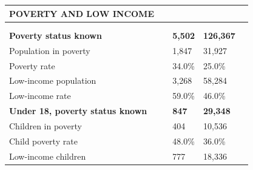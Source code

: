 \documentclass[9pt]{report}
\begin{document}
\vspace{12pt}
\setlength{\tabcolsep}{.01in} %
\begin{tabular}{p{.10in}p{.10in}p{.10in}p{3.7in}>{\hfill}p{.85in}>{\hfill}p{.85in}>{\hfill}p{.85in}>{\hfill}p{.85in}p{0.1in}}
\multicolumn{9}{l}{\parbox{7.1in}{\raggedright{\large{\strut\textbf{POVERTY AND LOW INCOME}\strut}}}} \\ 
\hline
\multicolumn{4}{l}{\parbox{3.5in}{\raggedright{\textbf{}}}} & \multicolumn{1}{r}{\parbox{.85in}{\strut\raggedleft{\textbf{}\strut}}} & \multicolumn{1}{r}{\parbox{.85in}{\strut\raggedleft{\textbf{}\strut}}} & \multicolumn{1}{r}{\parbox{.85in}{\strut{}}} & \multicolumn{1}{r}{\parbox{.85in}{\strut{}}} & \\ 
\multicolumn{9}{l}{} \\ 
\multicolumn{4}{l}{\parbox{3.5in}{\strut\raggedright{\textbf{Poverty status known}\strut}}} & \textbf{} & \textbf{} & \textbf{5,502} & \textbf{126,367} & \textbf{} \\ 
\multicolumn{4}{l}{\parbox{3.6in}{\strut\raggedright{{Population in poverty}}\strut}} &  &  & 1,847 & 31,927 & \multicolumn{1}{l}{}  \\ 
\multicolumn{4}{l}{\parbox{3.6in}{\strut\raggedright{{Poverty rate}}\strut}} &  &  & 34.0\% & 25.0\% & \multicolumn{1}{l}{}  \\ 
\multicolumn{4}{l}{\parbox{3.6in}{\strut\raggedright{{Low-income population}}\strut}} &  &  & 3,268 & 58,284 & \multicolumn{1}{l}{}  \\ 
\multicolumn{4}{l}{\parbox{3.6in}{\strut\raggedright{{Low-income rate}}\strut}} &  &  & 59.0\% & 46.0\% & \multicolumn{1}{l}{}  \\ 
\multicolumn{4}{l}{\parbox{3.5in}{\strut\raggedright{\textbf{Under 18, poverty status known}\strut}}} & \textbf{} & \textbf{} & \textbf{847} & \textbf{29,348} & \textbf{} \\ 
\multicolumn{4}{l}{\parbox{3.6in}{\strut\raggedright{{Children in poverty}}\strut}} &  &  & 404 & 10,536 & \multicolumn{1}{l}{}  \\ 
\multicolumn{4}{l}{\parbox{3.6in}{\strut\raggedright{{Child poverty rate}}\strut}} &  &  & 48.0\% & 36.0\% & \multicolumn{1}{l}{}  \\ 
\multicolumn{4}{l}{\parbox{3.6in}{\strut\raggedright{{Low-income children}}\strut}} &  &  & 777 & 18,336 & \multicolumn{1}{l}{}  \\ 

\end{tabular}
\end{document}
